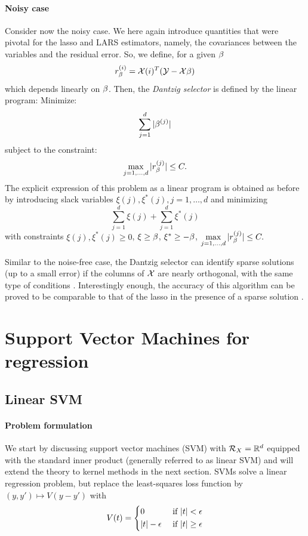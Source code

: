 \paragraph{Noisy case}

Consider now the noisy case. We here again introduce quantities that
were pivotal for the lasso and LARS estimators, namely, the covariances
between the variables and the residual error. So, we define, for a
given $\beta$
$$
r_\beta^{(i)} = {\mathcal X}(i)^T({\mathcal Y} - {\mathcal X}\beta)
$$
which depends linearly on $\beta$. Then, the {\em Dantzig selector} is defined
by the linear program: Minimize:
$$
\sum_{j=1}^d |\beta^{(j)}|
$$
subject to the constraint:
$$
\max\limits_{j=1, \ldots, d} |r_\beta^{(j)}| \leq C.
$$
The explicit expression of this problem as a linear program is obtained as
before by introducing slack variables $\xi(j), \xi^*(j), j=1, \ldots, d$ and
minimizing 
$$
\sum_{j=1}^d \xi(j) + \sum_{j=1}^d \xi^*(j)
$$
with constraints $\xi(j), \xi^*(j) \geq 0$, $\xi \geq \beta$, $\xi^*\geq -\beta$, $
\max\limits_{j=1, \ldots, d} |r_\beta^{(j)}| \leq C.
$

Similar to the noise-free case, the Dantzig selector can identify sparse
solutions (up to a small error) if the columns of ${\mathcal X}$ are nearly orthogonal, with the same
type of conditions \cite{ct07}. Interestingly enough, the accuracy of
this algorithm can be proved to be comparable to that of the lasso in the
presence of a sparse solution \cite{brt08}.

\section{Support Vector Machines for regression}
\label{sec:svm.reg}

\subsection{Linear SVM}

\paragraph{Problem formulation}
We start by discussing support vector machines (SVM) \cite{vapnik1998statistical,vapnik2013nature} with ${\mathcal R}_X = {\mathbb{R}}^d$ equipped with the standard inner product (generally referred to as linear SVM) and will extend the theory to kernel methods in the next section.
SVMs solve a linear regression problem, but replace the least-squares loss function by $(y,y') \mapsto V(y-y')$ with
\begin{equation}
\label{eq:svm.v}
V(t) = \left\{
\begin{aligned}
 &0 && \text{ if } |t| < \epsilon\\ 
 &|t|-\epsilon && \text{ if } |t| \geq \epsilon
 \end{aligned}\right.
\end{equation}

